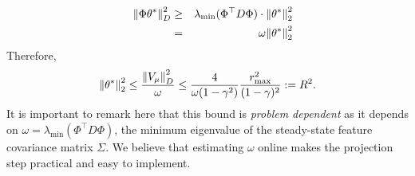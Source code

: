 \documentclass{colt2018} %
\begin{document}
\begin{eqnarray*}
\quad \norm{\Phi \theta^*}^2_D &\geq& \lambda_{\min}(\Phi^\top D \Phi) \cdot \norm{\theta^*}_2^2 \\
&=& \omega \norm{\theta^*}_2^2 
\end{eqnarray*}
Therefore, 
\begin{eqnarray*}
\norm{\theta^*}_2^2 \leq \frac{\norm{V_{\mu}}_{D}^2}{\omega} \leq \frac{4}{\omega(1-\gamma^2)} \frac{r_{\max}^2}{(1-\gamma)^2} := R^2.
\end{eqnarray*}
It is important to remark here that this bound is \emph{problem dependent} as it depends on $\omega = \lambda_{\min}(\Phi^\top D \Phi)$, the minimum eigenvalue of the steady-state feature covariance matrix $\Sigma$. We believe that estimating $\omega$ online makes the projection step practical and easy to implement.
\end{document}
